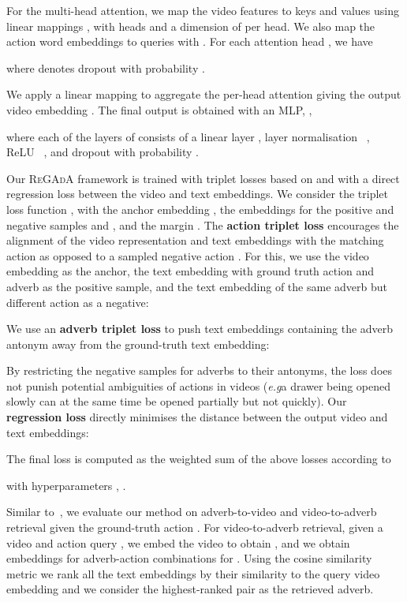 \documentclass[table]{bmvc2k}
\def\eg{\emph{e.g}\bmvaOneDot}
\newcommand{\modelName}{\textsc{ReGAdA}\xspace}
\begin{document}
For the multi-head attention, we map the video features  to keys and values using linear mappings ,  with  heads and a dimension of  per head. We also map the action word embeddings  to queries with . 
For each attention head , we have

where  denotes dropout with probability .

We apply a linear mapping  to aggregate the per-head attention giving the output video embedding .
The final output is obtained with an MLP, , 

where each of the  layers of  consists of a linear layer , layer normalisation~\cite{ba2016layer} , ReLU~\cite{nair2010rectified} , and dropout  with probability .

Our \modelName framework is trained with triplet losses based on \cite{doughty_action_2020} and with a direct regression loss between the video and text embeddings. 
We consider the triplet loss function , with the anchor embedding , the embeddings for the positive and negative samples  and , and the margin .
The \textbf{action triplet loss} encourages the alignment of the video representation  and text embeddings with the matching action as opposed to a sampled negative action . For this, we use the video embedding  as the anchor, the text embedding with ground truth action  and adverb  as the positive sample, and the text embedding of the same adverb but different action  as a negative:

We use an \textbf{adverb triplet loss} to push text embeddings containing the adverb antonym  away from the ground-truth text embedding:

By restricting the negative samples for adverbs to their antonyms, the loss does not punish potential ambiguities of actions in videos (\eg a drawer being opened slowly can at the same time be opened partially but not quickly). 
Our \textbf{regression loss} directly minimises the distance between the output video and text embeddings: 

The final loss is computed as the weighted sum of the above losses according to

with hyperparameters , .

Similar to~\cite{doughty_action_2020}, we evaluate our method on adverb-to-video and video-to-adverb retrieval given the ground-truth action . For video-to-adverb retrieval, given a video  and action query , we embed the video to obtain , and we obtain embeddings for  adverb-action combinations  for . Using the cosine similarity metric we rank all the text embeddings  by their similarity to the query video embedding  and we consider the highest-ranked pair as the retrieved adverb. 
\end{document}
